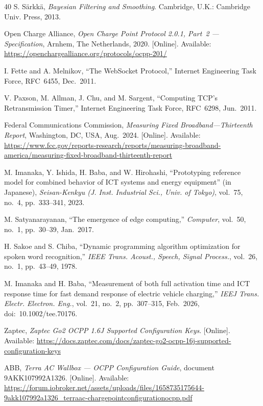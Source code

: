 \documentclass{ieeeaccess}
\begin{document}
\begin{thebibliography}{40}
         S. S\"{a}rkk\"{a}, \textit{Bayesian Filtering and Smoothing}. Cambridge, U.K.: Cambridge Univ. Press, 2013.

         Open Charge Alliance, \textit{Open Charge Point Protocol 2.0.1, Part~2 --- Specification}, Arnhem, The Netherlands, 2020. [Online]. Available: \url{https://openchargealliance.org/protocols/ocpp-201/}

         I. Fette and A. Melnikov, ``The WebSocket Protocol,'' Internet Engineering Task Force, RFC~6455, Dec.~2011.

         V. Paxson, M. Allman, J. Chu, and M. Sargent, ``Computing TCP's Retransmission Timer,'' Internet Engineering Task Force, RFC~6298, Jun.~2011.

         Federal Communications Commission, \textit{Measuring Fixed Broadband---Thirteenth Report}, Washington, DC, USA, Aug.~2024. [Online]. Available: \url{https://www.fcc.gov/reports-research/reports/measuring-broadband-america/measuring-fixed-broadband-thirteenth-report}

         M. Imanaka, Y. Ishida, H. Baba, and W. Hirohashi, ``Prototyping reference model for combined behavior of ICT systems and energy equipment'' (in Japanese), \textit{Seisan-Kenkyu (J. Inst. Industrial Sci., Univ. of Tokyo)}, vol.~75, no.~4, pp.~333--341, 2023.

         M. Satyanarayanan, ``The emergence of edge computing,'' \textit{Computer}, vol.~50, no.~1, pp.~30--39, Jan.~2017.

         H. Sakoe and S. Chiba, ``Dynamic programming algorithm optimization for spoken word recognition,'' \textit{IEEE Trans. Acoust., Speech, Signal Process.}, vol.~26, no.~1, pp.~43--49, 1978.

         M. Imanaka and H. Baba, ``Measurement of both full activation time and ICT response time for fast demand response of electric vehicle charging,'' \textit{IEEJ Trans. Electr. Electron. Eng.}, vol.~21, no.~2, pp.~307--315, Feb.~2026, doi:~10.1002/tee.70176.

         Zaptec, \textit{Zaptec Go2 OCPP 1.6J Supported Configuration Keys}. [Online]. Available: \url{https://docs.zaptec.com/docs/zaptec-go2-ocpp-16j-supported-configuration-keys}

         ABB, \textit{Terra AC Wallbox --- OCPP Configuration Guide}, document 9AKK107992A1326. [Online]. Available: \url{https://forum.iobroker.net/assets/uploads/files/1658735175644-9akk107992a1326_terraac-chargepointconfigurationocpp.pdf}

\end{thebibliography}
    \endgroup
\end{document}
